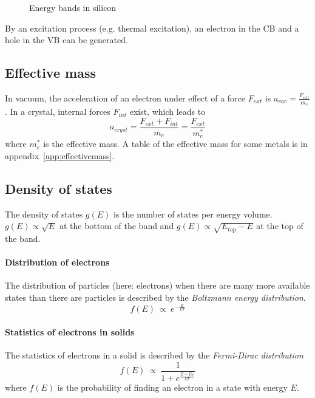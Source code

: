 \begin{figure}[ht!]
    \centering
    
    \caption{Energy bands in silicon}
\end{figure}

By an excitation process (e.g. thermal excitation), an electron in the CB and
a hole in the VB can be generated.

\subsection{Effective mass}
In vacuum, the acceleration of an electron under effect of a force $F_{ext}$ is $a_{vac} = \frac{F_{ext}}{m_e}$. 
In a crystal, internal forces $F_{int}$ exist, which leads to
\begin{equation}
    a_{cryst} = \frac{F_{ext}+F_{int}}{m_e} = \frac{F_{ext}}{m_e^*}
\end{equation}
where $m_e^*$ is the effective mass.
A table of the effective mass for some metals is in appendix~\ref{app:effectivemass}.

\subsection{Density of states}
The density of states $g(E)$ is the number of states per energy volume. 
$g(E) \propto \sqrt{E}$ at the bottom of the band and $g(E) \propto \sqrt{E_{top}-E}$ at the top of the band.

\paragraph{Distribution of electrons}
The distribution of particles (here: electrons) when there are many more available
 states than there are particles is described by the 
 \emph{Boltzmann energy distribution}.
\begin{equation}
    f(E) \:\propto\: e^{-\frac{E}{kT}}
\end{equation} 

\paragraph{Statistics of electrons in solids}
The statistics of electrons in a solid is described by the \emph{Fermi-Dirac distribution}
\begin{equation}
    f(E) \:\propto\: \frac{1}{1 + e^{\frac{E-E_F}{kT}}}
\end{equation}
where $f(E)$ is the probability of finding an electron in a state with energy $E$.


